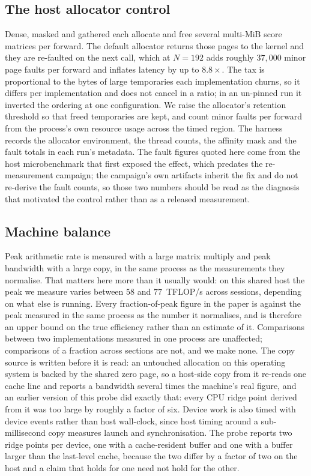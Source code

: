 \subsection{The host allocator control}
\label{app:cpu}

Dense, masked and gathered each allocate and free several multi-MiB score
matrices per forward. The default allocator returns those pages to the kernel
and they are re-faulted on the next call, which at $N{=}192$ adds roughly
$37{,}000$ minor page faults per forward and inflates latency by up to
$8.8\times$. The tax is proportional to the bytes of large temporaries each
implementation churns, so it differs per implementation and does not cancel in a
ratio; in an un-pinned run it inverted the ordering at one configuration. We
raise the allocator's retention threshold so that freed temporaries are kept,
and count minor faults per forward from the process's own resource usage across
the timed region. The harness records the allocator environment, the thread counts, the affinity
mask and the fault totals in each run's metadata. The fault figures quoted here
come from the host microbenchmark that first exposed the effect, which predates
the re-measurement campaign; the campaign's own artifacts inherit the fix and do
not re-derive the fault counts, so those two numbers should be read as the
diagnosis that motivated the control rather than as a released measurement.

\subsection{Machine balance}
\label{app:roofline}

Peak arithmetic rate is measured with a large matrix multiply and peak bandwidth
with a large copy, in the same process as the measurements they normalise. That
matters here more than it usually would: on this shared host the peak we measure
varies between $58$ and $77$~TFLOP/s across sessions, depending on what else is
running. Every fraction-of-peak figure in the paper is against the peak measured
in the same process as the number it normalises, and is therefore an upper bound
on the true efficiency rather than an estimate of it. Comparisons between two
implementations measured in one process are unaffected; comparisons of a
fraction across sections are not, and we make none. The
copy source is written before it is read: an untouched allocation on this
operating system is backed by the shared zero page, so a host-side copy from it
re-reads one cache line and reports a bandwidth several times the machine's
real figure, and an earlier version of this probe did exactly that: every CPU
ridge point derived from it was too large by roughly a factor of six. Device
work is also timed with device events rather than host wall-clock, since host
timing around a sub-millisecond copy measures launch and synchronisation. The
probe reports two ridge points per device, one with a cache-resident buffer and
one with a buffer larger than the last-level cache, because the two differ by a
factor of two on the host and a claim that holds for one need not hold for the
other.


